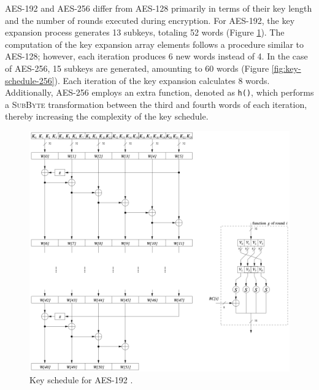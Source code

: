 AES-192 and AES-256 differ from AES-128 primarily in terms of their key length and the number of rounds executed during encryption.
For AES-192, the key expansion process generates 13 subkeys, totaling 52 words (Figure \ref{fig:key-schedule-192}). 
The computation of the key expansion array elements follows a procedure similar to AES-128; however, each iteration produces 6 new words instead of 4.
In the case of AES-256, 15 subkeys are generated, amounting to 60 words (Figure \ref{fig:key-schedule-256}). 
Each iteration of the key expansion calculates 8 words. 
Additionally, AES-256 employs an extra function, denoted as \texttt{h()}, which performs a \textsc{SubByte} transformation between the third and fourth words of each iteration, thereby increasing the complexity of the key schedule.

\begin{figure}[!ht]
    \centering
    \includegraphics[width=\textwidth]{img/key-schedule-192.png}
    \caption{Key schedule for AES-192 \cite{Paar2024}.}
    \label{fig:key-schedule-192}
\end{figure}

